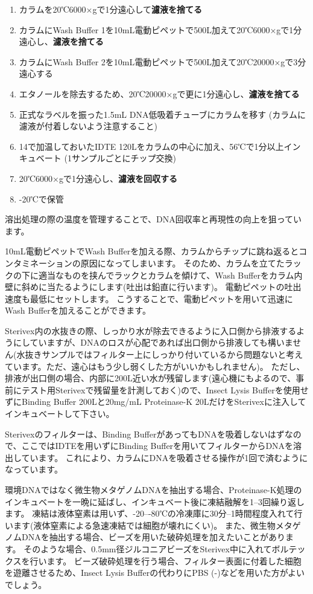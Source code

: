 \documentclass[titlepage,10pt,a4paper,uplatex]{jsbook}
\renewcommand{\textbf}[1]{{\bfseries\sffamily#1}}
\begin{document}
\begin{enumerate}
\item カラムを20℃6000×gで1分遠心して\textbf{濾液を捨てる}
\item カラムにWash Buffer 1を10mL電動ピペットで500{\textmu}L加えて20℃6000×gで1分遠心し、\textbf{濾液を捨てる}
\item カラムにWash Buffer 2を10mL電動ピペットで500{\textmu}L加えて20℃20000×gで3分遠心する
\item エタノールを除去するため、20℃20000×gで更に1分遠心し、\textbf{濾液を捨てる}
\item 正式なラベルを振った1.5mL DNA低吸着チューブにカラムを移す (カラムに濾液が付着しないよう注意すること)
\item 14で加温しておいたIDTE 120{\textmu}Lをカラムの中心に加え、56℃で1分以上インキュベート (1サンプルごとにチップ交換)
\item 20℃6000×gで1分遠心し、\textbf{濾液を回収する}
\item -20℃で保管
\end{enumerate}

溶出処理の際の温度を管理することで、DNA回収率と再現性の向上を狙っています。

10mL電動ピペットでWash Bufferを加える際、カラムからチップに跳ね返るとコンタミネーションの原因になってしまいます。
そのため、カラムを立てたラックの下に適当なものを挟んでラックとカラムを傾けて、Wash Bufferをカラム内壁に斜めに当たるようにします(吐出は鉛直に行います)。
電動ピペットの吐出速度も最低にセットします。
こうすることで、電動ピペットを用いて迅速にWash Bufferを加えることができます。

Sterivex内の水抜きの際、しっかり水が除去できるように入口側から排液するようにしていますが、DNAのロスが心配であれば出口側から排液しても構いません(水抜きサンプルではフィルター上にしっかり付いているから問題ないと考えています。ただ、遠心はもう少し弱くした方がいいかもしれません)。
ただし、排液が出口側の場合、内部に200{\textmu}L近い水が残留します(遠心機にもよるので、事前にテスト用Sterivexで残留量を計測しておく)ので、Insect Lysis Bufferを使用せずにBinding Buffer 200{\textmu}Lと20mg/mL Proteinase-K 20{\textmu}LだけをSterivexに注入してインキュベートして下さい。

Sterivexのフィルターは、Binding BufferがあってもDNAを吸着しないはずなので、ここではIDTEを用いずにBinding Bufferを用いてフィルターからDNAを溶出しています。
これにより、カラムにDNAを吸着させる操作が1回で済むようになっています。

環境DNAではなく微生物メタゲノムDNAを抽出する場合、Proteinase-K処理のインキュベートを一晩に延ばし、インキュベート後に凍結融解を1--3回繰り返します。
凍結は液体窒素は用いず、{-20}--{-80}℃の冷凍庫に30分--1時間程度入れて行います(液体窒素による急速凍結では細胞が壊れにくい)。
また、微生物メタゲノムDNAを抽出する場合、ビーズを用いた破砕処理を加えたいことがあります。
そのような場合、0.5mm径ジルコニアビーズをSterivex中に入れてボルテックスを行います\citep{Ushio2019}。
ビーズ破砕処理を行う場合、フィルター表面に付着した細胞を遊離させるため、Insect Lysis Bufferの代わりにPBS (-)などを用いた方がよいでしょう。
\end{document}
